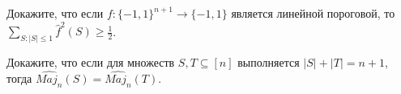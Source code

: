 \begin{task}
    Докажите, что если $f: \{-1, 1\}^{n + 1} \to \{-1, 1\}$ является линейной пороговой, то $\sum\limits_{S: |S| \le 1} \hat
    f^2(S) \ge \frac{1}{2}$.
\end{task}

\begin{task}
    Докажите, что если для множеств $S, T \subseteq [n]$ выполняется $|S| + |T| = n + 1$, тогда $\widehat{Maj_n}(S) =
    \widehat{Maj_n}(T)$.
\end{task}



